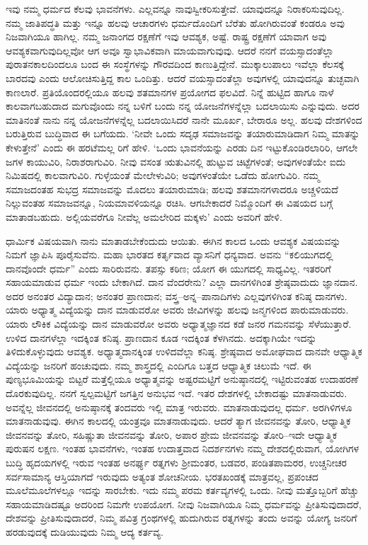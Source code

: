 ಇವು ನಮ್ಮ ಧರ್ಮದ ಕೆಲವು ಭಾವನೆಗಳು. ಎಲ್ಲವನ್ನೂ ನಾವುಸ್ವೀಕರಿಸುತ್ತೇವೆ. ಯಾವುದನ್ನೂ ನಿರಾಕರಿಸುವುದಿಲ್ಲ. ನಮ್ಮ ಜಾತಿಪದ್ಧತಿ ಮತ್ತು ಇನ್ನೂ ಹಲವು ಆಚಾರಗಳು ಧರ್ಮದೊಂದಿಗೆ ಬೆರೆತು ಹೋಗಿರುವಂತೆ ಕಂಡರೂ ಅವು ನಿಜವಾಗಿಯೂ ಹಾಗಿಲ್ಲ. ನಮ್ಮ ಜನಾಂಗದ ರಕ್ಷಣೆಗೆ ಇವು ಆವಶ್ಯಕ, ಅಷ್ಟೆ. ರಾಷ್ಟ್ರ ರಕ್ಷಣೆಗೆ ಯಾವಾಗ ಅವು ಆವಶ್ಯಕವಾಗುವುದಿಲ್ಲವೋ ಆಗ ಅವೂ ಸ್ವಾಭಾವಿಕವಾಗಿ ಮಾಯವಾಗುವುವು. ಆದರೆ ನನಗೆ ವಯಸ್ಸಾದಂತೆಲ್ಲಾ ಪುರಾತನಕಾಲದಿಂದಲೂ ಬಂದ ಈ ಸಂಸ್ಥೆಗಳನ್ನು ಗೌರವದಿಂದ ಕಾಣುತ್ತಿದ್ದೇನೆ. ಮುಕ್ಕಾಲುಪಾಲು ಇವೆಲ್ಲಾ ಕೆಲಸಕ್ಕೆ ಬಾರದವು ಎಂದು ಆಲೋಚಿಸುತ್ತಿದ್ದ ಕಾಲ ಒಂದಿತ್ತು. ಆದರೆ ವಯಸ್ಸಾದಂತೆಲ್ಲಾ ಅವುಗಳಲ್ಲಿ ಯಾವುದನ್ನೂ ತುಚ್ಛವಾಗಿ ಕಾಣಲಾರೆ. ಪ್ರತಿಯೊಂದರಲ್ಲಿಯೂ ಹಲವು ಶತಮಾನಗಳ ಪ್ರಯೋಗದ ಫಲವಿದೆ. ನಿನ್ನೆ ಹುಟ್ಟಿದ ಹಾಗೂ ನಾಳೆ ಕಾಲವಾಗಬಹುದಾದ ಮಗುವೊಂದು ನನ್ನ ಬಳಿಗೆ ಬಂದು ನನ್ನ ಯೋಜನೆ\-ಗಳನ್ನೆಲ್ಲಾ ಬದಲಾಯಿಸು ಎನ್ನುವುದು. ಅದರ ಮಾತಿನಂತೆ ನಾನು ನನ್ನ ಯೋಜನೆ\-ಗಳನ್ನೆಲ್ಲ ಬದಲಾಯಿಸಿದರೆ ನಾನೇ ಮೂರ್ಖ, ಬೇರಾರೂ ಅಲ್ಲ. ಹಲವು ದೇಶಗಳಿಂದ ಬರುತ್ತಿರುವ ಬುದ್ಧಿವಾದ ಈ ಬಗೆಯದು. ‘ನೀವೇ ಒಂದು ಸದೃಢ ಸಮಾಜವನ್ನು ತಯಾರುಮಾಡಿದಾಗ ನಿಮ್ಮ ಮಾತನ್ನು ಕೇಳುತ್ತೇನೆ’ ಎಂದು ಈ ಹರಟೆಮಲ್ಲ ರಿಗೆ ಹೇಳಿ. ‘ಒಂದು ಭಾವನೆಯನ್ನು ಎರಡು ದಿನ ಇಟ್ಟುಕೊಂಡಿರಲಾರಿರಿ, ಆಗಲೇ ಜಗಳ ಕಾಯುವಿರಿ, ನಿರಾಶರಾಗುವಿರಿ. ನೀವು ವಸಂತ ಋತುವಿನಲ್ಲಿ ಹುಟ್ಟುವ ಚಿಟ್ಟೆಗಳಂತೆ; ಅವುಗಳಂತೆಯೇ ಐದು ನಿಮಿಷದಲ್ಲಿ ಕಾಲವಾಗುವಿರಿ. ಗುಳ್ಳೆಯಂತೆ ಮೇಲೇಳುವಿರಿ; ಅವುಗಳಂತೆಯೇ ಒಡೆದು ಹೋಗುವಿರಿ. ನಮ್ಮ ಸಮಾಜದಂತಹ ಸುಭದ್ರ ಸಮಾಜವನ್ನು ಮೊದಲು ತಯಾರುಮಾಡಿ; ಹಲವು ಶತಮಾನಗಳಾದರೂ ಅಚ್ಚಳಿಯದೆ ನಿಲ್ಲುವಂತಹ ಸಮಾಜವನ್ನೂ, ನಿಯಮಾವಳಿಯನ್ನೂ ರಚಿಸಿ. ಆಗಬೇಕಾದರೆ ನಿಮ್ಮೊಂದಿಗೆ ಈ ವಿಷಯದ ಬಗ್ಗೆ ಮಾತಾಡಬಹುದು. ಅಲ್ಲಿಯವರೆಗೂ ನೀವೆಲ್ಲ ಅಮಲೇರಿದ ಮಕ್ಕಳು’ ಎಂದು ಅವರಿಗೆ ಹೇಳಿ. 

ಧಾರ್ಮಿಕ ವಿಷಯವಾಗಿ ನಾನು ಮಾತಾಡಬೇಕೆಂದುದು ಆಯಿತು. ಈಗಿನ ಕಾಲದ ಒಂದು ಆವಶ್ಯಕ ವಿಷಯವನ್ನು ನಿಮಗೆ ಜ್ಞಾಪಿಸಿ ಪೂರೈಸುವೆನು. ಮಹಾ ಭಾರತದ ಕರ್ತೃವಾದ ವ್ಯಾಸನಿಗೆ ಧನ್ಯವಾದ. ಅವನು “ಕಲಿಯುಗದಲ್ಲಿ ದಾನವೊಂದೇ ಧರ್ಮ” ಎಂದು ಸಾರಿರುವನು. ತಪಸ್ಸು ಕಠಿಣ; ಯೋಗ ಈ ಯುಗದಲ್ಲಿ ಸಾಧ್ಯವಿಲ್ಲ. ಇತರರಿಗೆ ಸಹಾಯಮಾಡುವ ಧರ್ಮ ಇಂದು ಬೇಕಾಗಿದೆ. ದಾನ ವೆಂದರೇನು? ಎಲ್ಲಾ ದಾನಗಳಿಗಿಂತ ಶ್ರೇಷ್ಠವಾದುದು ಜ್ಞಾನದಾನ. ಅದರ ಅನಂತರ ವಿದ್ಯಾದಾನ; ಅನಂತರ ಪ್ರಾಣದಾನ; ವಸ್ತ್ರ–ಅನ್ನ–ಪಾನಾದಿಗಳು ಎಲ್ಲವುಗಳಿಗಿಂತ ಕನಿಷ್ಠ ದಾನಗಳು. ಯಾರು ಅಧ್ಯಾತ್ಮ ವಿದ್ಯೆಯನ್ನು ದಾನ ಮಾಡುವರೋ ಅವರು ಜೀವಿಗಳನ್ನು ಹಲವು ಜನ್ಮಗಳಿಂದ ಪಾರುಮಾಡುವರು. ಯಾರು ಲೌಕಿಕ ವಿದ್ಯೆಯನ್ನು ದಾನ ಮಾಡುವರೋ ಅವರು ಅಧ್ಯಾತ್ಮಜ್ಞಾನದ ಕಡೆ ಜನರ ಗಮನವನ್ನು ಸೆಳೆಯುತ್ತಾರೆ. ಉಳಿದ ದಾನಗಳೆಲ್ಲಾ ಇದಕ್ಕಿಂತ ಕನಿಷ್ಠ. ಪ್ರಾಣದಾನ ಕೂಡ ಇದಕ್ಕಿಂತ ಕೆಳಗಿನದು. ಅದಕ್ಕಾಗಿಯೇ ಇದನ್ನು ತಿಳಿದುಕೊಳ್ಳುವುದು ಆವಶ್ಯಕ. ಅಧ್ಯಾತ್ಮದಾನಕ್ಕಿಂತ ಉಳಿದವೆಲ್ಲಾ ಕನಿಷ್ಠ. ಶ್ರೇಷ್ಠವಾದ ಅಮೋಘವಾದ ದಾನವೇ ಆಧ್ಯಾತ್ಮಿಕ ವಿದ್ಯೆಯನ್ನು ಜನರಿಗೆ ಹಂಚುವುದು. ನಮ್ಮ ಶಾಸ್ತ್ರದಲ್ಲಿ ಎಂದಿಗೂ ಬತ್ತದ ಆಧ್ಯಾತ್ಮಿಕ ಚಿಲುಮೆ ಇದೆ. ಈ ಪುಣ್ಯಭೂಮಿಯನ್ನು ಬಿಟ್ಟರೆ ಮತ್ತೆಲ್ಲಿಯೂ ಅಧ್ಯಾತ್ಮವನ್ನು ಅಷ್ಟರಮಟ್ಟಿಗೆ ಅನುಷ್ಠಾನದಲ್ಲಿ ಇಟ್ಟಿರುವಂತಹ ಉದಾ\-ಹರಣೆ ದೊರಕುವುದಿಲ್ಲ. ನನಗೆ ಸ್ವಲ್ಪಮಟ್ಟಿಗೆ ಜಗತ್ತಿನ ಅನುಭವ ಇದೆ. ಇತರ ದೇಶಗಳಲ್ಲಿ ಬೇಕಾದಷ್ಟು ಮಾತನಾಡುವರು. ಅವನ್ನೆಲ್ಲ ಜೀವನದಲ್ಲಿ ಅನುಷ್ಠಾನಕ್ಕೆ ತಂದವರು ಇಲ್ಲಿ ಮಾತ್ರ ಇರುವರು. ಮಾತನಾಡುವುದಲ್ಲ ಧರ್ಮ. ಅರಗಿಳಿಗಳೂ ಮಾತನಾಡುವುವು. ಈಗಿನ ಕಾಲದಲ್ಲಿ ಯಂತ್ರವೂ ಮಾತನಾಡುವುದು. ಆದರೆ ತ್ಯಾಗ ಜೀವನವನ್ನು ತೋರಿ, ಆಧ್ಯಾತ್ಮಿಕ ಜೀವನವನ್ನು ತೋರಿ, ಸಹಿಷ್ಣುತಾ ಜೀವನವನ್ನು ತೋರಿ, ಅಪಾರ ಪ್ರೇಮ ಜೀವನವನ್ನು ತೋರಿ–ಇದೇ ಆಧ್ಯಾತ್ಮಿಕ ಪುರುಷನ ಲಕ್ಷಣ. ಇಂತಹ ಭಾವನೆಗಳು, ಇಂತಹ ಉದಾತ್ತವಾದ ನಿದರ್ಶನಗಳು ನಮ್ಮ ದೇಶದಲ್ಲಿರುವಾಗ, ಯೋಗಿಗಳ ಬುದ್ಧಿ ಹೃದಯಗಳಲ್ಲಿ ಇರುವ ಇಂತಹ ಅನರ್ಘ್ಯ ರತ್ನಗಳು ಶ‍್ರೀಮಂತರ, ಬಡವರ, ಪಂಡಿತಪಾಮರರ, ಉಚ್ಚನೀಚರ ಸರ್ವಸಾಮಾನ್ಯ ಆಸ್ತಿಯಾಗದೆ ಇರುವುದು ಅತ್ಯಂತ ಶೋಚನೀಯ. ಭರತಖಂಡಕ್ಕೆ ಮಾತ್ರವಲ್ಲ, ಪ್ರಪಂಚದ ಮೂಲೆಮೂಲೆಗಳಲ್ಲೂ ಇದನ್ನು ಸಾರಬೇಕು. ಇದು ನಮ್ಮ ಪರಮ ಕರ್ತವ್ಯಗಳಲ್ಲಿ ಒಂದು. ನೀವು ಮತ್ತೊಬ್ಬರಿಗೆ ಹೆಚ್ಚು ಸಹಾಯಮಾಡಿದಷ್ಟೂ ಅದರಿಂದ ನಿಮಗೇ ಉಪಯೋಗ. ನೀವು ನಿಜವಾಗಿಯೂ ನಿಮ್ಮ ಧರ್ಮವನ್ನು ಪ್ರೀತಿಸುವುದಾದರೆ, ದೇಶವನ್ನು ಪ್ರೀತಿಸುವುದಾದರೆ, ನಿಮ್ಮ ಪವಿತ್ರ ಗ್ರಂಥಗಳಲ್ಲಿ ಹುದುಗಿರುವ ರತ್ನಗಳನ್ನು ತಂದು ಅವನ್ನು ಯೋಗ್ಯ ಜನರಿಗೆ ಹರಡುವುದಕ್ಕೆ ದುಡಿಯುವುದು ನಿಮ್ಮ ಆದ್ಯ ಕರ್ತವ್ಯ. 

